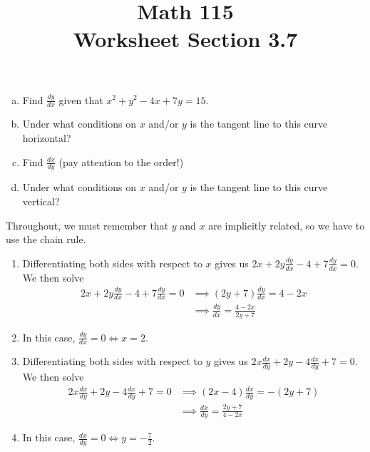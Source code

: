 \documentclass[11pt]{exam}
\title{\vspace{-0.5in} Math 115 \\ Worksheet Section 3.7}
\date{}
\newcommand{\dydx}{\frac{dy}{dx}}
\newcommand{\dxdy}{\frac{dx}{dy}}
\begin{document}
\maketitle
\vspace{-0.75in}
\begin{questions}
\question
  \begin{enumerate}[(a)]
	\item Find $\displaystyle\frac{dy}{dx}$ given that $x^2 + y^2 - 4x + 7y = 15$.
          \vspace{0.2in}
	\item Under what conditions on $x$ and/or $y$ is the tangent line to this curve horizontal? 
          \vspace{0.2in}
        \item Find $\displaystyle\frac{dx}{dy}$ (pay attention to the order!)
          \vspace{0.2in}
        \item Under what conditions on \(x\) and/or \(y\) is the
          tangent line to this curve vertical?
  \end{enumerate}
  \begin{solution}
    Throughout, we must remember that \(y\) and \(x\) are implicitly
    related, so we have to use the chain rule.
    \begin{enumerate}
    \item Differentiating both sides with respect to \(x\) gives us \(2x + 2y\dydx - 4 + 7
      \dydx = 0\). We then solve
      \begin{align*}
        2x + 2y\dydx - 4 + 7
        \dydx = 0 & \implies (2y+7)\dydx = 4-2x \\
        & \implies \dydx = \frac{4-2x}{2y+7}
      \end{align*}
    \item In this case, \(\dydx = 0 \iff x = 2\).
    \item Differentiating both sides with respect to \(y\) gives us
      \(2x \dxdy + 2y - 4 \dxdy + 7 = 0\). We then solve
      \begin{align*}
        2x \dxdy + 2y - 4 \dxdy + 7 = 0
        & \implies (2x-4) \dxdy = -(2y+7) \\
        & \implies \dxdy = \frac{2y+7}{4-2x}
      \end{align*}
    \item In this case, \(\dxdy = 0 \iff y = -\frac{7}{2}\).
    \end{enumerate}
  \end{solution}
          \vspace{0.2in}

\end{questions}
\end{document}
